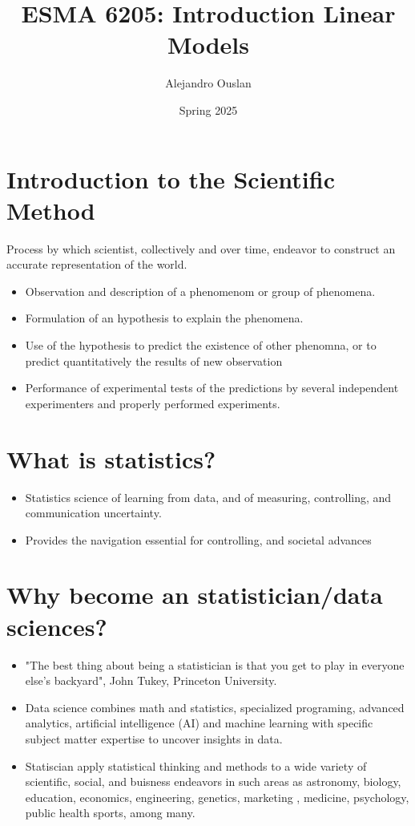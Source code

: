 \documentclass[10pt, oneside]{article}
\title{ESMA 6205: Introduction Linear Models}
\author{Alejandro Ouslan}
\date{Spring 2025}
\begin{document}
\maketitle
\tableofcontents

\vspace{.25in}

\section{Introduction to the Scientific Method}
Process by which scientist, collectively and over time, endeavor to construct an accurate representation of
the world.
\begin{itemize}
	\item Observation and description of a phenomenom or group of phenomena.
	\item Formulation of an hypothesis to explain the phenomena.
	\item Use of the hypothesis to predict the existence of other phenomna, or to predict quantitatively the results of new observation
	\item Performance of experimental tests of the predictions by several independent experimenters and properly performed experiments.
\end{itemize}

\section{What is statistics?}

\begin{itemize}
	\item Statistics science of learning from data, and of measuring, controlling, and communication uncertainty.
	\item Provides the navigation essential for controlling, and societal advances
\end{itemize}

\section{Why become an statistician/data sciences?}
\begin{itemize}
	\item "The best thing about being a statistician is that you get to play in everyone else's backyard",
	      John Tukey, Princeton University.
	\item Data science combines math and statistics, specialized programing, advanced analytics, artificial intelligence (AI)
	      and machine learning with specific subject matter expertise to uncover insights in data.
	\item Statiscian apply statistical thinking and methods to a wide variety of scientific, social, and buisness
	      endeavors in such areas as astronomy, biology, education, economics, engineering, genetics, marketing , medicine,
	      psychology, public health sports, among many.
\end{itemize}
\end{document}
